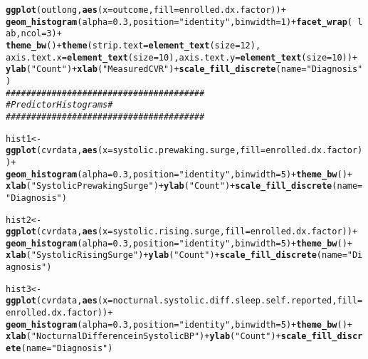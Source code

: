 \documentclass[10pt]{article}\usepackage[]{graphicx}\usepackage[]{color}
\makeatletter
\newcommand{\hlnum}[1]{\textcolor[rgb]{0.686,0.059,0.569}{#1}}%
\newcommand{\hlstr}[1]{\textcolor[rgb]{0.192,0.494,0.8}{#1}}%
\newcommand{\hlcom}[1]{\textcolor[rgb]{0.678,0.584,0.686}{\textit{#1}}}%
\newcommand{\hlopt}[1]{\textcolor[rgb]{0,0,0}{#1}}%
\newcommand{\hlstd}[1]{\textcolor[rgb]{0.345,0.345,0.345}{#1}}%
\newcommand{\hlkwb}[1]{\textcolor[rgb]{0.69,0.353,0.396}{#1}}%
\newcommand{\hlkwc}[1]{\textcolor[rgb]{0.333,0.667,0.333}{#1}}%
\newcommand{\hlkwd}[1]{\textcolor[rgb]{0.737,0.353,0.396}{\textbf{#1}}}%
\newenvironment{kframe}{%
 \def\at@end@of@kframe{}%
 \ifinner\ifhmode%
  \def\at@end@of@kframe{\end{minipage}}%
  \begin{minipage}{\columnwidth}%
 \fi\fi%
 \def\FrameCommand##1{\hskip\@totalleftmargin \hskip-\fboxsep
 \colorbox{shadecolor}{##1}\hskip-\fboxsep
     \hskip-\linewidth \hskip-\@totalleftmargin \hskip\columnwidth}%
 \MakeFramed {\advance\hsize-\width
   \@totalleftmargin\z@ \linewidth\hsize
   \@setminipage}}%
 {\par\unskip\endMakeFramed%
 \at@end@of@kframe}
\newenvironment{knitrout}{}{} %
\makeatother
\begin{document}
\begin{knitrout}
\begin{kframe}
\begin{alltt}
\hlkwd{ggplot}\hlstd{(outlong,} \hlkwd{aes}\hlstd{(}\hlkwc{x}\hlstd{=outcome,} \hlkwc{fill} \hlstd{= enrolled.dx.factor))} \hlopt{+}
  \hlkwd{geom_histogram}\hlstd{(}\hlkwc{alpha}\hlstd{=}\hlnum{0.3}\hlstd{,} \hlkwc{position}\hlstd{=}\hlstr{"identity"}\hlstd{,} \hlkwc{binwidth} \hlstd{=} \hlnum{1}\hlstd{)} \hlopt{+} \hlkwd{facet_wrap}\hlstd{(}\hlopt{~}\hlstd{lab,} \hlkwc{ncol}\hlstd{=}\hlnum{3}\hlstd{)} \hlopt{+}
  \hlkwd{theme_bw}\hlstd{()} \hlopt{+} \hlkwd{theme}\hlstd{(}\hlkwc{strip.text} \hlstd{=} \hlkwd{element_text}\hlstd{(}\hlkwc{size}\hlstd{=}\hlnum{12}\hlstd{),}
          \hlkwc{axis.text.x} \hlstd{=} \hlkwd{element_text}\hlstd{(}\hlkwc{size}\hlstd{=}\hlnum{10}\hlstd{),} \hlkwc{axis.text.y}  \hlstd{=} \hlkwd{element_text}\hlstd{(}\hlkwc{size}\hlstd{=}\hlnum{10}\hlstd{))} \hlopt{+}
  \hlkwd{ylab}\hlstd{(}\hlstr{"Count"}\hlstd{)} \hlopt{+} \hlkwd{xlab}\hlstd{(}\hlstr{"Measured CVR"}\hlstd{)} \hlopt{+} \hlkwd{scale_fill_discrete}\hlstd{(}\hlkwc{name} \hlstd{=} \hlstr{"Diagnosis"}\hlstd{)}
\hlcom{#######################################}
\hlcom{#  Predictor Histograms               #}
\hlcom{#######################################}

\hlstd{hist1} \hlkwb{<-} \hlkwd{ggplot}\hlstd{(cvrdata,} \hlkwd{aes}\hlstd{(}\hlkwc{x}\hlstd{=systolic.prewaking.surge,} \hlkwc{fill} \hlstd{= enrolled.dx.factor))} \hlopt{+}
  \hlkwd{geom_histogram}\hlstd{(}\hlkwc{alpha}\hlstd{=}\hlnum{0.3}\hlstd{,} \hlkwc{position}\hlstd{=}\hlstr{"identity"}\hlstd{,} \hlkwc{binwidth} \hlstd{=} \hlnum{5}\hlstd{)} \hlopt{+} \hlkwd{theme_bw}\hlstd{()} \hlopt{+}
  \hlkwd{xlab}\hlstd{(}\hlstr{"Systolic Prewaking Surge"}\hlstd{)} \hlopt{+} \hlkwd{ylab}\hlstd{(}\hlstr{"Count"}\hlstd{)} \hlopt{+} \hlkwd{scale_fill_discrete}\hlstd{(}\hlkwc{name} \hlstd{=} \hlstr{"Diagnosis"}\hlstd{)}

\hlstd{hist2} \hlkwb{<-} \hlkwd{ggplot}\hlstd{(cvrdata,} \hlkwd{aes}\hlstd{(}\hlkwc{x}\hlstd{=systolic.rising.surge,} \hlkwc{fill} \hlstd{= enrolled.dx.factor))} \hlopt{+}
  \hlkwd{geom_histogram}\hlstd{(}\hlkwc{alpha}\hlstd{=}\hlnum{0.3}\hlstd{,} \hlkwc{position}\hlstd{=}\hlstr{"identity"}\hlstd{,} \hlkwc{binwidth} \hlstd{=} \hlnum{5}\hlstd{)} \hlopt{+} \hlkwd{theme_bw}\hlstd{()} \hlopt{+}
  \hlkwd{xlab}\hlstd{(}\hlstr{"Systolic Rising Surge"}\hlstd{)} \hlopt{+} \hlkwd{ylab}\hlstd{(}\hlstr{"Count"}\hlstd{)} \hlopt{+} \hlkwd{scale_fill_discrete}\hlstd{(}\hlkwc{name} \hlstd{=} \hlstr{"Diagnosis"}\hlstd{)}

\hlstd{hist3} \hlkwb{<-} \hlkwd{ggplot}\hlstd{(cvrdata,} \hlkwd{aes}\hlstd{(}\hlkwc{x}\hlstd{=nocturnal.systolic.diff.sleep.self.reported,} \hlkwc{fill} \hlstd{= enrolled.dx.factor))} \hlopt{+}
  \hlkwd{geom_histogram}\hlstd{(}\hlkwc{alpha}\hlstd{=}\hlnum{0.3}\hlstd{,} \hlkwc{position}\hlstd{=}\hlstr{"identity"}\hlstd{,} \hlkwc{binwidth} \hlstd{=} \hlnum{5}\hlstd{)} \hlopt{+} \hlkwd{theme_bw}\hlstd{()} \hlopt{+}
  \hlkwd{xlab}\hlstd{(}\hlstr{"Nocturnal Difference in Systolic BP"}\hlstd{)} \hlopt{+} \hlkwd{ylab}\hlstd{(}\hlstr{"Count"}\hlstd{)} \hlopt{+} \hlkwd{scale_fill_discrete}\hlstd{(}\hlkwc{name} \hlstd{=} \hlstr{"Diagnosis"}\hlstd{)}


\end{alltt}
\end{kframe}
\end{knitrout}
\end{document}
